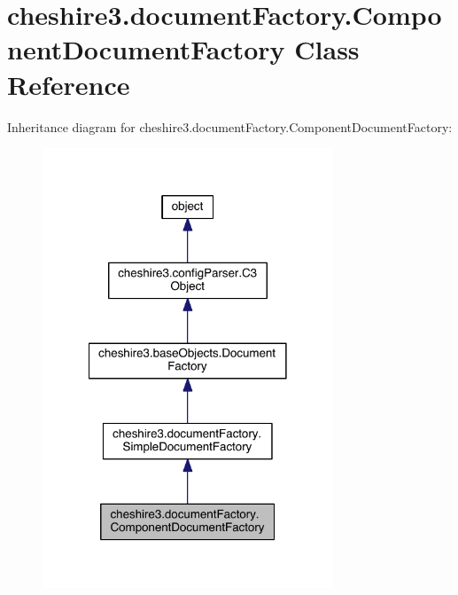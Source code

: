 \hypertarget{classcheshire3_1_1document_factory_1_1_component_document_factory}{\section{cheshire3.\-document\-Factory.\-Component\-Document\-Factory Class Reference}
\label{classcheshire3_1_1document_factory_1_1_component_document_factory}
}


Inheritance diagram for cheshire3.\-document\-Factory.\-Component\-Document\-Factory\-:
\nopagebreak
\begin{figure}[H]
\begin{center}
\leavevmode
\includegraphics[width=246pt]{classcheshire3_1_1document_factory_1_1_component_document_factory__inherit__graph}
\end{center}
\end{figure}


